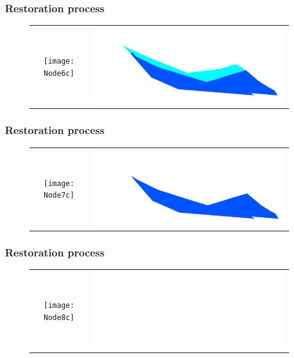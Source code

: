 \documentclass{beamer}
\begin{document}
	\begin{frame}
	\frametitle{Restoration process}
	\begin{figure}[H]
	\centering
	\begin{tabular}{@{}cc@{}}
	\texttt{[image: Node6c]}&
	\includegraphics[width=.65\textwidth]{chartreusedroite37.png}\\
	\end{tabular}
	\end{figure}
	\end{frame}
		\begin{frame}
	\frametitle{Restoration process}
	\begin{figure}[H]
	\centering
	\begin{tabular}{@{}cc@{}}
	\texttt{[image: Node7c]}&
	\includegraphics[width=.65\textwidth]{chartreusedroite38.png}\\
	\end{tabular}
	\end{figure}
	\end{frame}
	
	\begin{frame}
	\frametitle{Restoration process}
	\begin{figure}[H]
	\centering
	\begin{tabular}{@{}cc@{}}
	\texttt{[image: Node8c]}&
	\includegraphics[width=.65\textwidth]{chartreusedroite10.png}\\
	\end{tabular}
	\end{figure}
	\end{frame}	
	
\end{document}
